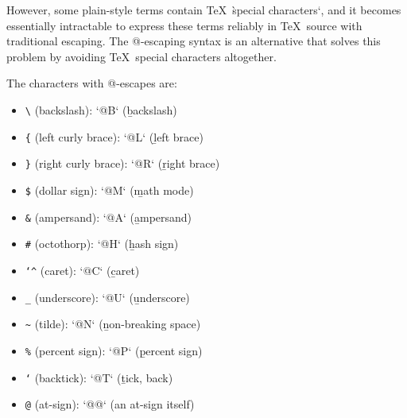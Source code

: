 However, some plain-style terms contain \TeX\ \`special characters`, and it
becomes essentially intractable to express these terms reliably in \TeX\ source
with traditional escaping. The @-escaping syntax is an alternative that solves
this problem by avoiding \TeX\ special characters altogether.

The characters with @-escapes are:
\begin{itemize}
    \item \b{\texttt{\textbackslash} (backslash)}: \tex`@B` (\b{b}ackslash)
    \item \b{\texttt{\{} (left curly brace)}: \tex`@L` (\b{l}eft brace)
    \item \b{\texttt{\}} (right curly brace)}: \tex`@R` (\b{r}ight brace)
    \item \b{\texttt{\$} (dollar sign)}: \tex`@M` (\b{m}ath mode)
    \item \b{\texttt{\&} (ampersand)}: \tex`@A` (\b{a}mpersand)
    \item \b{\texttt{\#} (octothorp)}: \tex`@H` (\b{h}ash sign)
    \item \b{\texttt{\char`\^} (caret)}: \tex`@C` (\b{c}aret)
    \item \b{\texttt{\_} (underscore)}: \tex`@U` (\b{u}nderscore)
    \item \b{\texttt{\textasciitilde} (tilde)}: \tex`@N` (\b{n}on-breaking space)
    \item \b{\texttt{\%} (percent sign)}: \tex`@P` (\b{p}ercent sign)
    \item \b{\texttt{`} (backtick)}: \tex`@T` (\b{t}ick, back)
    \item \b{\texttt{@} (at-sign)}: \tex`@@` (an at-sign itself)
\end{itemize}
